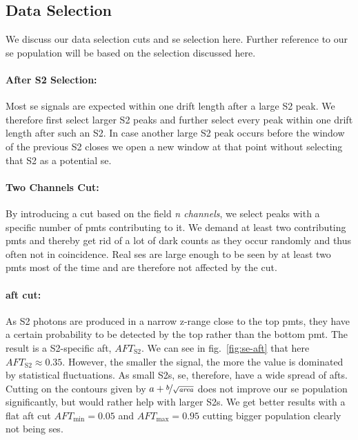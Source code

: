 
\FloatBarrier
\subsection{Data Selection}
\label{ssec:tagging}
\FloatBarrier


We discuss our data selection cuts and \gls{se} selection here.
Further reference to our \gls{se} population will be based on the selection discussed here.

\paragraph{After S2 Selection:} Most \gls{se} signals are expected within one drift length after a large S2 peak.
We therefore first select larger S2 peaks and further select every peak within one drift length after such an S2.
In case another large S2 peak occurs before the window of the previous S2 closes we open a new window at that point without selecting that S2 as a potential \gls{se}.


\paragraph{Two Channels Cut:} By introducing a cut based on the field \emph{n channels}, we select peaks with a specific number of \glspl{pmt} contributing to it.
We demand at least two contributing \glspl{pmt} and thereby get rid of a lot of dark counts as they occur randomly and thus often not in coincidence.
Real \glspl{se} are large enough to be seen by at least two \glspl{pmt} most of the time and are therefore not affected by the cut.

\paragraph{\gls{aft} cut:} As S2 photons are produced in a narrow z-range close to the top \glspl{pmt}, they have a certain probability to be detected by the top rather than the bottom \gls{pmt}.
The result is a S2-specific \gls{aft}, $ \mathit{AFT}_\mathrm{S2} $.
We can see in fig.~\ref{fig:se-aft} that here $ \mathit{AFT}_\mathrm{S2} \approx 0.35 $.
However, the smaller the signal, the more the value is dominated by statistical fluctuations.
As small S2s, \gls{se}, therefore, have a wide spread of \glspl{aft}.
Cutting on the contours given by $ a + \nicefrac{b}{\sqrt{\mathit{area}}} $ does not improve our \gls{se} population significantly, but would rather help with larger S2s.
We get better results with a flat \gls{aft} cut $ \mathit{AFT}_\mathrm{min} = 0.05 $ and $ \mathit{AFT}_\mathrm{max} = 0.95 $ cutting bigger population clearly not being \glspl{se}.

